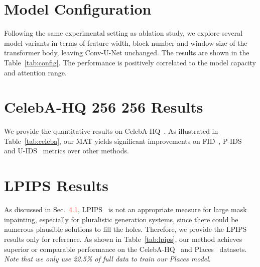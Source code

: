 \documentclass[10pt,twocolumn,letterpaper]{article}
\begin{document}
	\section{Model Configuration}
	Following the same experimental setting as ablation study, we explore several model variants in terms of feature width, block number and window size of the transformer body, leaving Conv-U-Net unchanged. The results are shown in the Table~\ref{tab:config}. The performance is positively correlated to the model capacity and attention range. 

	\begin{table}[t]
		\small
		\centering
\caption{Ablation study on model configuration.}
		\label{tab:config}
	\end{table}
	
	\section{CelebA-HQ 256  256 Results}
	
	We provide the quantitative results on  CelebA-HQ~\cite{karras2018progressive}. As illustrated in Table~\ref{tab:celeba}, our MAT yields significant improvements on FID~\cite{heusel2017gans}, P-IDS~\cite{zhao2020large} and U-IDS~\cite{zhang2018unreasonable} metrics over other methods.
	
	\section{LPIPS Results}
	As discussed in Sec.~\textcolor{red}{4.1}, LPIPS~\cite{zhang2018unreasonable} is not an appropriate measure for large mask inpainting, especially for pluralistic generation systems, since there could be numerous plausible solutions to fill the holes. Therefore, we provide the LPIPS results only for reference. As shown in Table~\ref{tab:lpips}, our method achieves superior or comparable performance on the CelebA-HQ~\cite{karras2018progressive} and Places~\cite{zhou2017places} datasets. \textit{Note that we only use 22.5\% of full data to train our Places model}.
	
\end{document}
